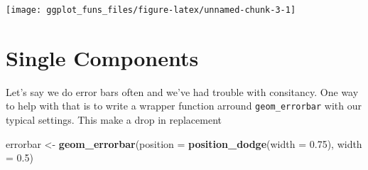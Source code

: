 \documentclass[]{book}
\newenvironment{Shaded}{\begin{snugshade}}{\end{snugshade}}
\newcommand{\DataTypeTok}[1]{\textcolor[rgb]{0.13,0.29,0.53}{#1}}
\newcommand{\FloatTok}[1]{\textcolor[rgb]{0.00,0.00,0.81}{#1}}
\newcommand{\KeywordTok}[1]{\textcolor[rgb]{0.13,0.29,0.53}{\textbf{#1}}}
\newcommand{\NormalTok}[1]{#1}
\newcommand{\StringTok}[1]{\textcolor[rgb]{0.31,0.60,0.02}{#1}}
\theoremstyle{definition}
\theoremstyle{definition}
\theoremstyle{definition}
\theoremstyle{remark}
\begin{document}
\begin{center}\texttt{[image: ggplot\_funs\_files/figure-latex/unnamed-chunk-3-1]} \end{center}

\hypertarget{single-components}{%
\section{Single Components}\label{single-components}}

Let's say we do error bars often and we've had trouble with consitancy.
One way to help with that is to write a wrapper function arround
\texttt{geom\_errorbar} with our typical settings. This make a drop in
replacement

\begin{Shaded}
\begin{Highlighting}[]
\NormalTok{errorbar <-}\StringTok{ }\KeywordTok{geom_errorbar}\NormalTok{(}\DataTypeTok{position =} \KeywordTok{position_dodge}\NormalTok{(}\DataTypeTok{width =} \FloatTok{0.75}\NormalTok{), }
                  \DataTypeTok{width =} \FloatTok{0.5}\NormalTok{)}


\end{Highlighting}
\end{Shaded}
\end{document}
